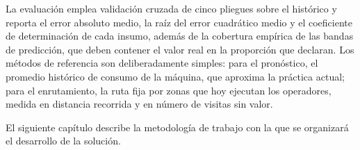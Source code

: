 La evaluación emplea validación cruzada de cinco pliegues sobre el histórico y reporta el error absoluto medio, la raíz del error cuadrático medio y el coeficiente de determinación de cada insumo, además de la cobertura empírica de las bandas de predicción, que deben contener el valor real en la proporción que declaran. Los métodos de referencia son deliberadamente simples: para el pronóstico, el promedio histórico de consumo de la máquina, que aproxima la práctica actual; para el enrutamiento, la ruta fija por zonas que hoy ejecutan los operadores, medida en distancia recorrida y en número de visitas sin valor.

El siguiente capítulo describe la metodología de trabajo con la que se organizará el desarrollo de la solución.
